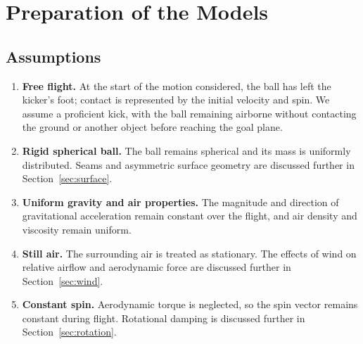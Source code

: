 \documentclass[12pt,letterpaper]{article}
\begin{document}
\section{Preparation of the Models}
\subsection{Assumptions}
\begin{enumerate}
\item \textbf{Free flight.} At the start of the motion considered, the ball has left the kicker's foot; contact is represented by the initial velocity and spin. We assume a proficient kick, with the ball remaining airborne without contacting the ground or another object before reaching the goal plane.
\item \textbf{Rigid spherical ball.} The ball remains spherical and its mass is uniformly distributed. Seams and asymmetric surface geometry are discussed further in Section~\ref{sec:surface}.
\item \textbf{Uniform gravity and air properties.} The magnitude and direction of gravitational acceleration remain constant over the flight, and air density and viscosity remain uniform.
\item \textbf{Still air.} The surrounding air is treated as stationary. The effects of wind on relative airflow and aerodynamic force are discussed further in Section~\ref{sec:wind}.
\item \textbf{Constant spin.} Aerodynamic torque is neglected, so the spin vector remains constant during flight. Rotational damping is discussed further in Section~\ref{sec:rotation}.
\end{enumerate}
\end{document}
